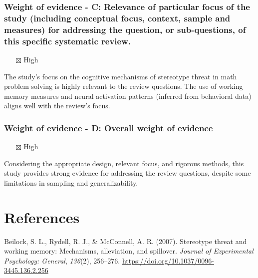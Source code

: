 \documentclass[
  doc, a4paper]{apa7}
\providecommand{\tightlist}{%
  \setlength{\itemsep}{0pt}\setlength{\parskip}{0pt}}
\newlength{\cslhangindent}
\newenvironment{CSLReferences}[2] %
 {\begin{list}{}{%
  \setlength{\itemindent}{0pt}
  \setlength{\leftmargin}{0pt}
  \setlength{\parsep}{0pt}
  \ifodd #1
   \setlength{\leftmargin}{\cslhangindent}
   \setlength{\itemindent}{-1\cslhangindent}
  \fi
  \setlength{\itemsep}{#2\baselineskip}}}
 {\end{list}}
\begin{document}
\subsubsection{Weight of evidence - C: Relevance of particular focus of the study (including conceptual focus, context, sample and measures) for addressing the question, or sub-questions, of this specific systematic review.}\label{weight-of-evidence---c-relevance-of-particular-focus-of-the-study-including-conceptual-focus-context-sample-and-measures-for-addressing-the-question-or-sub-questions-of-this-specific-systematic-review.}

\begin{itemize}
\tightlist
\item[$\boxtimes$]
  High
\end{itemize}

The study's focus on the cognitive mechanisms of stereotype threat in math problem solving is highly relevant to the review questions. The use of working memory measures and neural activation patterns (inferred from behavioral data) aligns well with the review's focus.

\subsubsection{Weight of evidence - D: Overall weight of evidence}\label{weight-of-evidence---d-overall-weight-of-evidence}

\begin{itemize}
\tightlist
\item[$\boxtimes$]
  High
\end{itemize}

Considering the appropriate design, relevant focus, and rigorous methods, this study provides strong evidence for addressing the review questions, despite some limitations in sampling and generalizability.

\section{References}\label{references}

\label{refs}
\begin{CSLReferences}{1}{0}
Beilock, S. L., Rydell, R. J., \& McConnell, A. R. (2007). Stereotype threat and working memory: {Mechanisms}, alleviation, and spillover. \emph{Journal of Experimental Psychology: General}, \emph{136}(2), 256--276. \url{https://doi.org/10.1037/0096-3445.136.2.256}

\end{CSLReferences}
\end{document}
